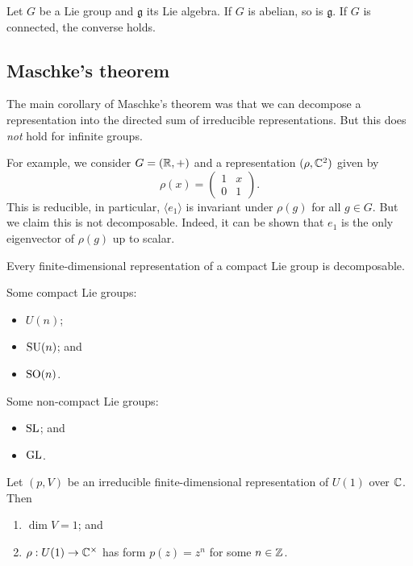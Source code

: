 \begin{proposition}
    Let $G$ be a Lie group and $\mathfrak g$ its Lie algebra. If $G$ is abelian, so is $\mathfrak g$. If $G$ is connected, the converse holds. 
\end{proposition}

\subsection{Maschke's theorem}

The main corollary of Maschke's theorem was that we can decompose a representation into the directed sum of irreducible representations. But this does \emph{not} hold for infinite groups. 

For example, we consider $G = (\mathbb R, +)$ and a representation $(\rho, \mathbb C^2)$ given by
\[
    \rho(x) =
    \begin{pmatrix}
        1 & x \\
        0 & 1
    \end{pmatrix}.
\]
This is reducible, in particular, $\langle e_1 \rangle$ is invariant under $\rho(g)$ for all $g \in G$. But we claim this is not decomposable. Indeed, it can be shown that $e_1$ is the only eigenvector of $\rho(g)$ up to scalar.

\begin{theorem}
    Every finite-dimensional representation of a compact Lie group is decomposable.
\end{theorem}

Some compact Lie groups:
\begin{itemize}
    \item $U(n)$;
    \item $\operatorname{SU}(n)$; and
    \item $\operatorname{SO}(n)$.
\end{itemize}

Some non-compact Lie groups:
\begin{itemize}
    \item $\operatorname{SL}$; and 
    \item $\operatorname{GL}$.
\end{itemize}

\begin{theorem}
    Let $(p, V)$ be an irreducible finite-dimensional representation of $U(1)$ over $\mathbb C$. Then
    \begin{enumerate}
        \item $\dim V = 1$; and
        \item $\rho: U(1) \to \mathbb C^\times$ has form $p(z) = z^n$ for some $n \in \mathbb Z$. 
    \end{enumerate}
\end{theorem}
